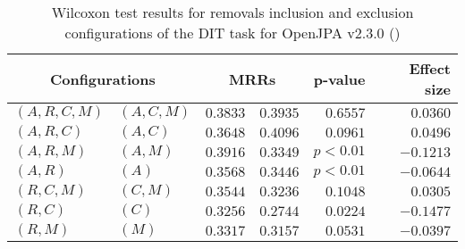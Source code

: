 
\begin{table}
\begin{spacing}{1.2}
\centering
\caption{Wilcoxon test results for removals inclusion and exclusion configurations of the DIT task for OpenJPA v2.3.0 (\ctwo)}
\label{table:versus-wilcox-openjpa-dit-removals}
\begin{tabular}{ll|rr|rr}
\toprule
      \multicolumn{2}{c|}{Configurations} &                \multicolumn{2}{c|}{MRRs} &             p-value & Effect size \\
\midrule
 $(A,R,C,M)$ &  $(A,C,M)$ &       $0.3833$ &  $\bm{0.3935}$ & $0.6557$ &    $0.0360$ \\
   $(A,R,C)$ &    $(A,C)$ &       $0.3648$ &  $\bm{0.4096}$ & $0.0961$ &    $0.0496$ \\
   $(A,R,M)$ &    $(A,M)$ &  $\bm{0.3916}$ &       $0.3349$ & $p<0.01$ &   $-0.1213$ \\
     $(A,R)$ &      $(A)$ &  $\bm{0.3568}$ &       $0.3446$ & $p<0.01$ &   $-0.0644$ \\
   $(R,C,M)$ &    $(C,M)$ &  $\bm{0.3544}$ &       $0.3236$ & $0.1048$ &    $0.0305$ \\
     $(R,C)$ &      $(C)$ &  $\bm{0.3256}$ &       $0.2744$ & $0.0224$ &   $-0.1477$ \\
     $(R,M)$ &      $(M)$ &  $\bm{0.3317}$ &       $0.3157$ & $0.0531$ &   $-0.0397$ \\
\bottomrule
\end{tabular}

\end{spacing}
\end{table}

